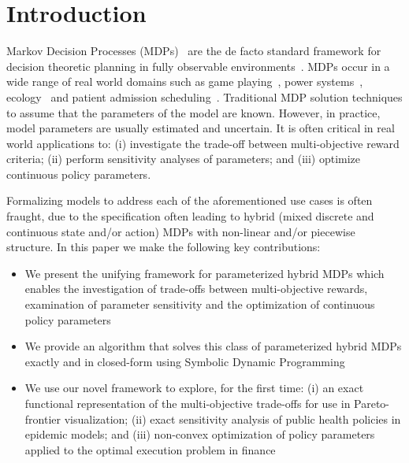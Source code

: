 \section{Introduction}
\label{sec:introduction}

Markov Decision Processes (MDPs)~\parencite{Howard_MIT_1960} are the de facto standard framework for decision theoretic
planning in fully observable environments~\parencite{Boutilier_JAIR_1999}. MDPs occur in a wide range of real world domains such as game playing~\parencite{Szita_RL_2012}, power systems~\parencite{Reddy_IJCAI_2011}, ecology~\parencite{Williams_EM_2009} and patient admission scheduling~\parencite{Zhu_AIM_2014}. Traditional MDP solution techniques to assume that the parameters of the model are known. However, in practice, model parameters are usually estimated and uncertain. It is often critical in real world applications to: (i) investigate the trade-off between multi-objective reward criteria; (ii) perform sensitivity analyses of parameters; and (iii) optimize continuous policy parameters.

Formalizing models to address each of the aforementioned use cases is often fraught, due to the specification often leading to 
hybrid (mixed discrete and continuous state and/or action) MDPs with non-linear and/or piecewise structure. In this paper we make the following key contributions:
\begin{itemize}
    \item We present the unifying framework for parameterized hybrid MDPs which enables the investigation of trade-offs between multi-objective rewards, examination of parameter sensitivity and the optimization of continuous policy parameters \\
    \item We provide an algorithm that solves this class of parameterized hybrid MDPs exactly and in closed-form using Symbolic Dynamic Programming~\parencite{Boutilier_IJCAI_2001} \\
    \item We use our novel framework to explore, for the first time: (i) an exact functional representation of the multi-objective trade-offs for use in Pareto-frontier visualization; (ii) exact sensitivity analysis of public health policies in epidemic models; and (iii) non-convex optimization of policy parameters applied to the optimal execution problem in finance
\end{itemize}


